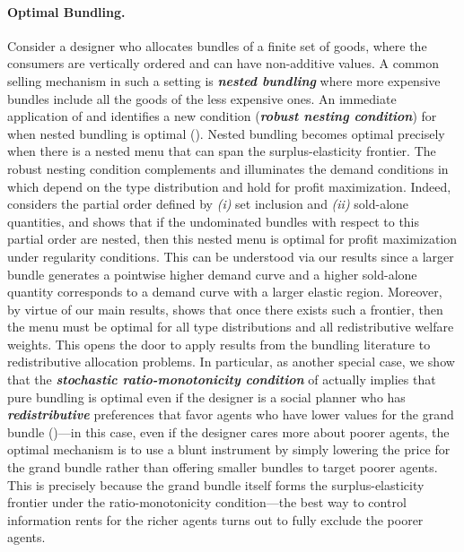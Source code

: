 \documentclass[12pt,letterpaper]{article}
\newenvironment{original}{\color{black}\noindent}{}
\theoremstyle{plain}
\theoremstyle{definition}
\theoremstyle{remark}
\renewcommand{\1}{\mathds{1}}
\theoremstyle{definition}
\begin{document}
\paragraph{Optimal Bundling.}\hspace{-2mm}\begin{original}Consider a designer who allocates bundles of a finite set of goods, where the consumers are vertically ordered and can have non-additive values. A common selling mechanism in such a setting is \textit{\textbf{nested bundling}} where more expensive bundles include all the goods of the less expensive ones. An immediate application of  and  identifies a new condition (\textit{\textbf{robust nesting condition}}) for when nested bundling is optimal (). Nested bundling becomes optimal precisely when there is a nested menu that can span the surplus-elasticity frontier. The robust nesting condition complements and illuminates the demand conditions in \citet{yang2023nested} which depend on the type distribution and hold for profit maximization. Indeed, \citet{yang2023nested} considers the partial order defined by \textit{(i)} set inclusion and \textit{(ii)} sold-alone quantities, and shows that if the undominated bundles with respect to this partial order are nested, then this nested menu is optimal for profit maximization under regularity conditions. This can be understood via our results since a larger bundle generates a pointwise higher demand curve and a higher sold-alone quantity corresponds to a demand curve with a larger elastic region. Moreover, by virtue of our main results,  shows that once there exists such a frontier, then the menu must be optimal for all type distributions and all redistributive welfare weights. This opens the door to apply results from the bundling literature to redistributive allocation problems. In particular, as another special case, we show that the \textit{\textbf{stochastic ratio-monotonicity condition}} of \citet{haghpanah2021pure} actually implies that pure bundling is optimal even if the designer is a social planner who has \textit{\textbf{redistributive}} preferences that favor agents who have lower values for the grand bundle ()---in this case, even if the designer cares more about poorer agents, the optimal mechanism is to use a blunt instrument by simply lowering the price for the grand bundle rather than offering smaller bundles to target poorer agents. This is precisely because the grand bundle itself forms the surplus-elasticity frontier under the ratio-monotonicity condition---the best way to control information rents for the richer agents turns out to fully exclude the poorer agents.
\end{original}
\end{document}
